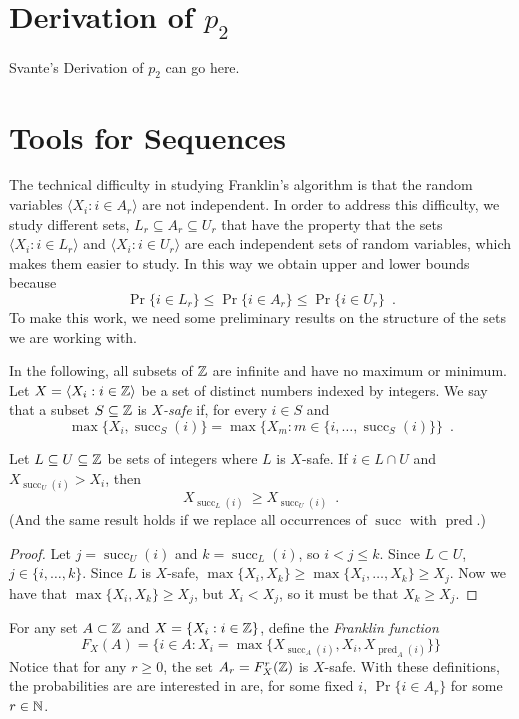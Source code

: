 \documentclass{patmorin}
\DeclareMathOperator{\cw}{succ}
\DeclareMathOperator{\ccw}{pred}
\begin{document}
\section{Derivation of $p_2$}

Svante's Derivation of $p_2$ can go here.

\section{Tools for Sequences}

The technical difficulty in studying Franklin's algorithm is that the
random variables $\langle X_i:i\in A_r\rangle$ are not independent.  In order to
address this difficulty, we study different sets, $L_r\subseteq
A_r\subseteq U_r$ that have the property that the sets $\langle X_i:i\in L_r\rangle$
and $\langle X_i:i\in U_r\rangle$ are each independent sets of random variables, which
makes them easier to study. In this way we obtain upper and lower bounds because
\[
    \Pr\{i\in L_r\} \le \Pr\{i\in A_r\} \le \Pr\{i\in U_r\} \enspace .
\]
To make this work, we need some preliminary results on the structure of
the sets we are working with.

In the following, all subsets of $\mathbb{Z}$ are infinite and have no maximum
or minimum.  Let $X=\langle X_i:i\in \mathbb{Z}\rangle$ be a set of distinct numbers indexed
by integers.  We say that a subset $S\subseteq\mathbb{Z}$ is \emph{$X$-safe}
if, for every $i\in S$ and
\[
    \max\{X_i,\cw_S(i)\} = \max\{X_m: m\in \{i,\ldots,\cw_S(i)\}\} \enspace .
\]

\begin{lem}
   Let $L\subseteq U\subseteq\mathbb{Z}$ be sets of integers where $L$
   is $X$-safe.  If $i\in L\cap U$ and $X_{\cw_U(i)} > X_i$, then
   \[
         X_{\cw_L(i)}\ \ge X_{\cw_U(i)} \enspace . 
   \]
   (And the same result holds if we replace all occurrences of $\cw$
   with $\ccw$.)
\end{lem}

\begin{proof}
   Let $j = \cw_U(i)$ and $k=\cw_L(i)$, so $i < j \le k$.
   Since $L\subset U$, $j\in \{i,\ldots,k\}$.  Since $L$ is $X$-safe,
   $\max\{X_i,X_k\} \ge \max\{X_i,\ldots,X_k\} \ge X_j$.  Now we have
   that $\max\{X_i,X_k\} \ge X_j$, but $X_i < X_j$, so it must be that
   $X_k\ge X_j$.
\end{proof}

For any set $A\subset\mathbb{Z}$ and $X=\{X_i:i\in \mathbb{Z}\}$, define the
\emph{Franklin function}
\[
   F_X(A) = \{ i\in A : X_{i} = \max\{X_{\cw_A(i)},X_i,X_{\ccw_A(i)}\} \}
\]
Notice that for any $r\ge 0$, the set $A_r=F^r_X(\mathbb{Z})$ is $X$-safe.
With these definitions, the probabilities are are interested in are,
for some fixed $i$, $\Pr\{i\in A_r\}$ for some $r\in\mathbb{N}$.
\end{document}
